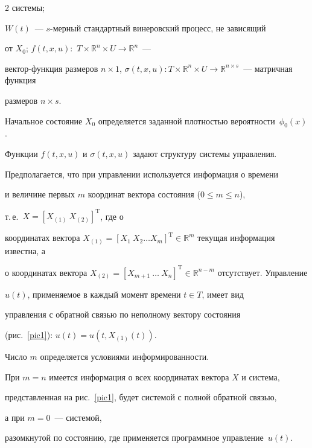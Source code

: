 \begin{multicols}{2}
 сис\-те\-мы; 


$W(t)$~--- $s$-мер\-ный стандартный винеровский процесс, не зависящий 


от $X_0$; $f(t,x,u) \colon$ $T \times \mathbb{R}^n \times U \rightarrow \mathbb{R}^n$~--- 


век\-тор-функ\-ция размеров ${n \times 1}$, ${\sigma(t,x,u) \colon T \times 


\mathbb{R}^n \times U \rightarrow \mathbb{R}^{n \times s}}$~--- матричная функция 


раз\-ме\-ров ${n \times s}$.





Начальное состояние $X_0$ определяется заданной плотностью вероятности~$\phi_0(x)$. 


Функции $f(t,x,u)$ и $\sigma(t,x,u)$ задают структуру сис\-те\-мы управления.





Предполагается, что при управлении используется информация о времени


и величине первых $m$ координат вектора состояния (${0 \leq m \leq n}$), 


т.\,е.\ ${X = [X_{(1)} ~ X_{(2)}]^\mathrm{T}}$, где о


координатах вектора ${X_{(1)} = [{X_1} \ {X_2} \dots 


{X_m}]^\mathrm{T} \in \mathbb{R}^m}$ текущая информация известна, а


о координатах вектора ${X_{(2)} = [ {X_{m+1}} ~ {\dots} ~


{X_n}]^\mathrm{T} \in \mathbb{R}^{n - m}}$ отсутствует. Управ\-ле\-ние


$u(t)$, применяемое в каждый момент времени ${t \in T}$, имеет вид


управления с обратной \mbox{связью} по неполному вектору состояния 


(рис.~\ref{pic1}): ${u(t) = u(t,X_{(1)}(t))}$.





Число $m$ определяется условиями информированности. 


При ${m = n}$ имеется информация о всех координатах вектора $X$ и сис\-те\-ма,


представленная на рис.~\ref{pic1}, будет сис\-те\-мой с полной обратной связью, 


а при ${m = 0}$~--- сис\-те\-мой,


разомкнутой по состоянию, где применяется программное управление~$u(t)$.






\end{multicols}
